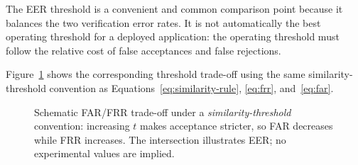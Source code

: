 \documentclass[11pt,a4paper,oneside]{report}
\newif\ifTikZAvailable
\begin{document}
The EER threshold is a convenient and common comparison point because it
balances the two verification error rates. It is not automatically the best
operating threshold for a deployed application: the operating threshold must
follow the relative cost of false acceptances and false rejections.

Figure~\ref{fig:far-frr} shows the corresponding threshold trade-off
using the same similarity-threshold convention as
Equations~\eqref{eq:similarity-rule},
\eqref{eq:frr},
and~\eqref{eq:far}.

\begin{figure}[htbp]
\centering

\ifTikZAvailable

\begin{tikzpicture}[x=1.16cm,y=4.5cm]
%
    \draw[
        ->,
        line width=0.75pt
    ]
    (0,0)
    --
    (8.7,0)
    node[right]{
        \small similarity threshold \(t\)
    };
%
    \draw[
        ->,
        line width=0.75pt
    ]
    (0,0)
    --
    (0,1.08)
    node[above]{
        \small error rate
    };
%
%
    \draw[
        PlotBlue,
        line width=1.05pt,
        smooth
    ]
    plot coordinates {
        (0.4,0.94)
        (1.2,0.82)
        (2.0,0.68)
        (2.8,0.54)
        (3.6,0.42)
        (4.4,0.31)
        (5.2,0.21)
        (6.0,0.13)
        (6.8,0.07)
        (7.8,0.02)
    };
%
%
    \draw[
        SapienzaRed,
        line width=1.05pt,
        smooth
    ]
    plot coordinates {
        (0.4,0.02)
        (1.2,0.05)
        (2.0,0.10)
        (2.8,0.17)
        (3.6,0.25)
        (4.4,0.34)
        (5.2,0.46)
        (6.0,0.60)
        (6.8,0.76)
        (7.8,0.94)
    };
%
    \fill[
        DarkText
    ]
    (4.25,0.325)
    circle
    (1.8pt);
%
    \draw[
        dashed,
        MidGray
    ]
    (4.25,0)
    --
    (4.25,0.325);
%
    \node[
        above right,
        fill=white,
        inner sep=1.5pt
    ]
    at (4.25,0.325) {
        \small EER
    };
%
    \node[
        PlotBlue
    ]
    at (6.9,0.18) {
        \small \(\mathrm{FAR}(t)\)
    };
%
    \node[
        SapienzaRed
    ]
    at (6.85,0.90) {
        \small \(\mathrm{FRR}(t)\)
    };
%
\end{tikzpicture}

\else


\fi

\caption{
Schematic FAR/FRR trade-off under a
\emph{similarity-threshold} convention:
increasing \(t\) makes acceptance stricter,
so FAR decreases while FRR increases.
The intersection illustrates EER;
no experimental values are implied.
}
\label{fig:far-frr}

\end{figure}
\end{document}
